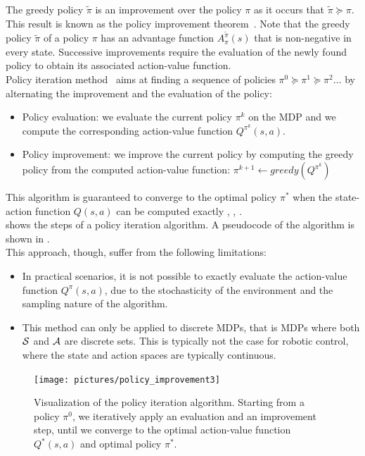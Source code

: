 The greedy policy $\tilde{\pi}$ is an improvement over the policy $\pi$ as it occurs that $\tilde{\pi}\succcurlyeq\pi$. This result is known as the policy improvement theorem~\cite{BELLMAN1958228}. Note that the greedy policy $\tilde{\pi}$ of a policy $\pi$ has an advantage function $A_{\pi}^{\tilde{\pi}}(s)$ that is non-negative in every state. Successive improvements require the evaluation of the newly found policy to obtain its associated action-value function.\\
Policy iteration method~\cite{howard:dp} aims at finding a sequence of policies $\pi^0 \succcurlyeq \pi^1  \succcurlyeq \pi^2 \ldots$ by alternating the improvement and the evaluation of the policy:
\begin{itemize}
\item Policy evaluation: we evaluate the current policy $\pi^k$ on the MDP and we compute the corresponding action-value function $Q^{\pi^k}(s,a)$.
\item Policy improvement: we improve the current policy by computing the greedy policy from the computed action-value function: $\pi^{k+1} \gets greedy\left( Q^{\pi^k} \right)$
\end{itemize}

This algorithm is guaranteed to converge to the optimal policy $\pi^*$ when the state-action function $Q(s,a)$ can be computed exactly \cite{10.2307/3689239}, \cite{6796861}, \cite{Tsitsiklis:2003:COP:944919.944922}.\\
 shows the steps of a policy iteration algorithm. A pseudocode of the algorithm is shown in .\\
This approach, though, suffer from the following limitations:
\begin{itemize}
\item In practical scenarios, it is not possible to exactly evaluate the action-value function $Q^\pi(s,a)$, due to the stochasticity of the environment and the sampling nature of the algorithm.
\item This method can only be applied to discrete MDPs, that is MDPs where both $\mathcal{S}$ and $\mathcal{A}$ are discrete sets. This is typically not the case for robotic control, where the state and action spaces are typically continuous.
\end{itemize}

\begin{figure}[t]
\centering
\texttt{[image: pictures/policy\_improvement3]}
\caption{Visualization of the policy iteration algorithm. Starting from a policy $\pi^0$, we iteratively apply an evaluation and an improvement step, until we converge to the optimal action-value function $Q^*(s,a)$ and optimal policy $\pi^*$.}
\label{fig:policy-iteration}
\end{figure}

